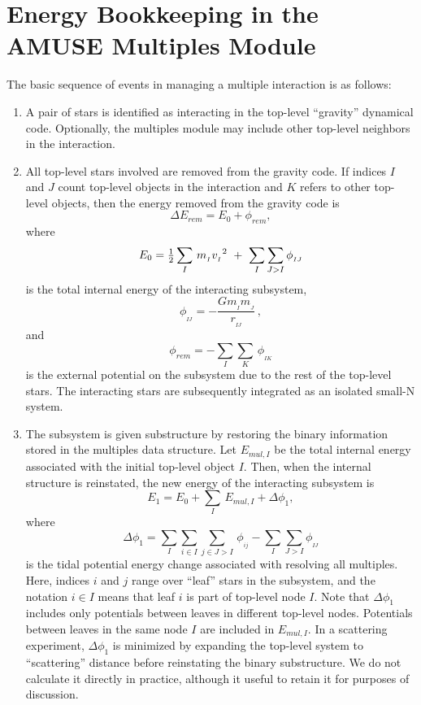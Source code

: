 \documentclass[12pt]{article}
\newcommand{\half}{{\ensuremath\textstyle\frac12}}
\newcommand{\subsub}[2]{{\ensuremath{#1}_{_{{#2}}}}}
\begin{document}
\section*{Energy Bookkeeping in the AMUSE Multiples Module}

The basic sequence of events in managing a multiple interaction is as
follows:

\begin{enumerate}

\item A pair of stars is identified as interacting in the top-level
  ``gravity'' dynamical code.  Optionally, the multiples module may
  include other top-level neighbors in the interaction.

\item All top-level stars involved are removed from the gravity code.
  If indices $I$ and $J$ count top-level objects in the interaction
  and $K$ refers to other top-level objects, then the energy removed
  from the gravity code is
  $$
	\Delta E_{rem} = E_0 + \phi_{rem},
  $$
  where
  $$
	E_0 = \half\sum_I\,\subsub{m}{I}\subsub{v}{I}^2
		 ~+~ \sum_I\sum_{J>I}\subsub{\phi}{IJ}
  $$
  is the total internal energy of the interacting subsystem,
  $$
	\subsub{\phi}{IJ} = -\frac{G\subsub{m}{I}\subsub{m}{J}}
				  {\subsub{r}{IJ}}\,,
  $$
  and
  $$
	\phi_{rem} = -\sum_I\sum_K\,\subsub{\phi}{IK}
  $$
  is the external potential on the subsystem due to the rest of the
  top-level stars.  The interacting stars are subsequently integrated
  as an isolated small-N system.

\item The subsystem is given substructure by restoring the binary
  information stored in the multiples data structure.  Let $E_{mul,I}$
  be the total internal energy associated with the initial top-level
  object $I$.  Then, when the internal structure is reinstated, the
  new energy of the interacting subsystem is
  $$
	E_1 = E_0 + \sum_I\,E_{mul,I} + \Delta\phi_1,
  $$
  where
  $$
	\Delta\phi_1 = \sum_I\sum_{i\in I}\sum_{j\in J>I}\,
						\subsub{\phi}{ij}
			- \sum_I\sum_{J>I}\subsub{\phi}{IJ}
  $$
  is the tidal potential energy change associated with resolving all
  multiples.  Here, indices $i$ and $j$ range over ``leaf'' stars in
  the subsystem, and the notation $i\in I$ means that leaf $i$ is part
  of top-level node $I$.  Note that $\Delta\phi_1$ includes only
  potentials between leaves in different top-level nodes.  Potentials
  between leaves in the same node $I$ are included in $E_{mul,I}$.  In
  a scattering experiment, $\Delta\phi_1$ is minimized by expanding
  the top-level system to ``scattering'' distance before reinstating
  the binary substructure.  We do not calculate it directly in
  practice, although it useful to retain it for purposes of
  discussion.


\end{enumerate}
\end{document}
